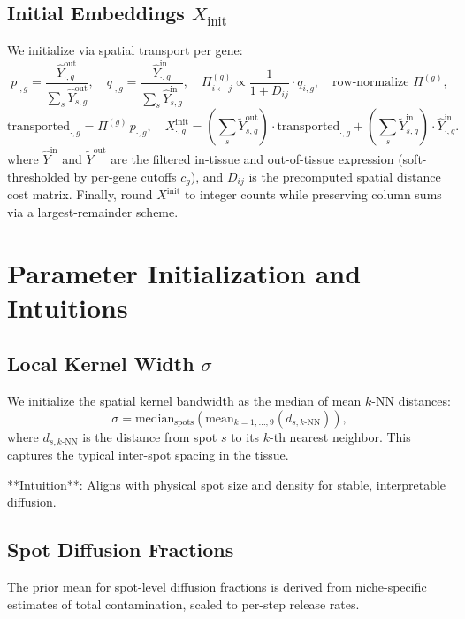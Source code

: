 \documentclass[11pt]{article}
\begin{document}
\subsection{Initial Embeddings $X_{\text{init}}$}
We initialize via spatial transport per gene:
\[
p_{\cdot,g}=\frac{\widehat{Y}^{\text{out}}_{\cdot,g}}{\sum_s \widehat{Y}^{\text{out}}_{s,g}},\quad
q_{\cdot,g}=\frac{\widehat{Y}^{\text{in}}_{\cdot,g}}{\sum_s \widehat{Y}^{\text{in}}_{s,g}},\quad
\Pi^{(g)}_{i\leftarrow j} \propto \frac{1}{1+D_{ij}}\cdot q_{i,g},\quad \text{row-normalize }\Pi^{(g)},
\]
\[
\text{transported}_{\cdot,g} = \Pi^{(g)}\,p_{\cdot,g},\quad
X^{\text{init}}_{\cdot,g} = \left(\sum_s \widetilde{Y}^{\text{out}}_{s,g}\right)\cdot \text{transported}_{\cdot,g} + \left(\sum_s \widetilde{Y}^{\text{in}}_{s,g}\right)\cdot \widehat{Y}^{\text{in}}_{\cdot,g}.
\]
where $\widehat{Y}^{\text{in}}$ and $\widetilde{Y}^{\text{out}}$ are the filtered in-tissue and out-of-tissue expression (soft-thresholded by per-gene cutoffs $c_g$), and $D_{ij}$ is the precomputed spatial distance cost matrix. Finally, round $X^{\text{init}}$ to integer counts while preserving column sums via a largest-remainder scheme.



\section{Parameter Initialization and Intuitions}

\subsection{Local Kernel Width $\sigma$}

We initialize the spatial kernel bandwidth as the median of mean $k$-NN distances:
\[
\sigma = \text{median}_{\text{spots}}\left(\text{mean}_{k=1,\ldots,9}(d_{s,k\text{-NN}})\right),
\]
where $d_{s,k\text{-NN}}$ is the distance from spot $s$ to its $k$-th nearest neighbor. This captures the typical inter-spot spacing in the tissue.

**Intuition**: Aligns with physical spot size and density for stable, interpretable diffusion.

\subsection{Spot Diffusion Fractions}

The prior mean for spot-level diffusion fractions is derived from niche-specific estimates of total contamination, scaled to per-step release rates.
\end{document}
